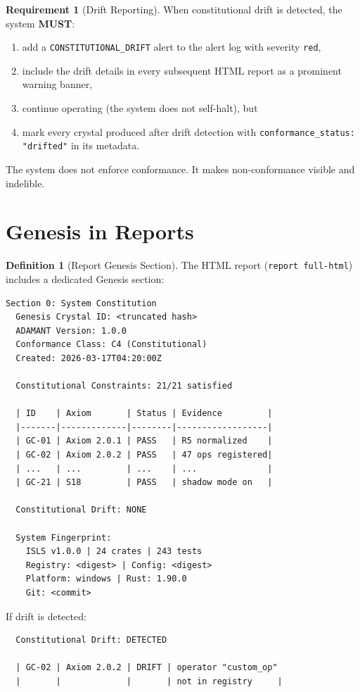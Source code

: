 \documentclass[11pt,a4paper,twoside]{article}
\theoremstyle{definition}
\newtheorem{definition}{Definition}[section]
\newtheorem{requirement}{Requirement}[section]
\theoremstyle{plain}
\theoremstyle{remark}
\begin{document}
\begin{requirement}[Drift Reporting]\label{req:driftreport}
When constitutional drift is detected, the system \textbf{MUST}:
\begin{enumerate}[nosep,label=(\alph*)]
  \item add a \texttt{CONSTITUTIONAL\_DRIFT} alert to the alert log
        with severity \texttt{red},
  \item include the drift details in every subsequent HTML report
        as a prominent warning banner,
  \item continue operating (the system does not self-halt), but
  \item mark every crystal produced after drift detection with
        \texttt{conformance\_status: "drifted"} in its metadata.
\end{enumerate}
The system does not enforce conformance. It makes non-conformance
visible and indelible.
\end{requirement}


\section{Genesis in Reports}\label{sec:reports}

\begin{definition}[Report Genesis Section]\label{def:reportsection}
The HTML report (\texttt{report full-html}) includes a dedicated
Genesis section:

\begin{lstlisting}[title={Genesis Section in HTML Report}]
Section 0: System Constitution
  Genesis Crystal ID: <truncated hash>
  ADAMANT Version: 1.0.0
  Conformance Class: C4 (Constitutional)
  Created: 2026-03-17T04:20:00Z
  
  Constitutional Constraints: 21/21 satisfied
  
  | ID    | Axiom       | Status | Evidence         |
  |-------|-------------|--------|------------------|
  | GC-01 | Axiom 2.0.1 | PASS   | R5 normalized    |
  | GC-02 | Axiom 2.0.2 | PASS   | 47 ops registered|
  | ...   | ...         | ...    | ...              |
  | GC-21 | S18         | PASS   | shadow mode on   |
  
  Constitutional Drift: NONE
  
  System Fingerprint:
    ISLS v1.0.0 | 24 crates | 243 tests
    Registry: <digest> | Config: <digest>
    Platform: windows | Rust: 1.90.0
    Git: <commit>
\end{lstlisting}

If drift is detected:
\begin{lstlisting}
  Constitutional Drift: DETECTED
  
  | GC-02 | Axiom 2.0.2 | DRIFT | operator "custom_op"
  |       |             |       | not in registry     |
\end{lstlisting}
\end{definition}
\end{document}
